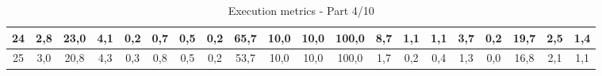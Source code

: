 \begin{sidewaystable}[]
\begin{tabular}{|c|c|c|c|c|c|c|c|c|c|c|c|c|c|c|c|c|c|c|c|}
    24 & 2,8                                              & 23,0                                             & 4,1                                              & 0,2                                              & 0,7                                              & 0,5                                              & 0,2                                              & 65,7                                            & 10,0                                            & 10,0                                            & 100,0                                           & 8,7                                             & 1,1                                             & 1,1                                             & 3,7                                             & 0,2                                             & 19,7                                             & 2,5                                              & 1,4                                              \\ \hline
    25 & 3,0                                              & 20,8                                             & 4,3                                              & 0,3                                              & 0,8                                              & 0,5                                              & 0,2                                              & 53,7                                            & 10,0                                            & 10,0                                            & 100,0                                           & 1,7                                             & 0,2                                             & 0,4                                             & 1,3                                             & 0,0                                             & 16,8                                             & 2,1                                              & 1,1                                              \\ \hline
    \end{tabular}
    \caption{Execution metrics - Part 4/10}
    \label{tab:ap:exec_metrics_4}
\end{sidewaystable}

